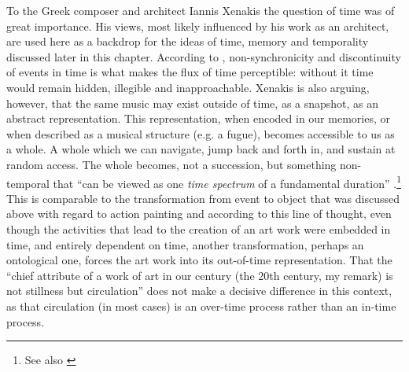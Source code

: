 
To the Greek composer and architect Iannis Xenakis the question of time was of great importance. His views, most likely influenced by his work as an architect, are used here as a backdrop for the ideas of time, memory and temporality discussed later in this chapter. According to \citet{xenakis71}, non-synchronicity and discontinuity of events in time is what makes the flux of time perceptible: without it time would remain hidden, illegible and inapproachable. %
Xenakis is also arguing, however, that the same music may exist outside of time, as a snapshot, as an abstract representation. This representation, when encoded in our memories, or when described as a musical structure (e.g. a fugue), becomes accessible to us as a whole. A whole which we can navigate, jump back and forth in, and sustain at random access. The whole becomes, not a succession, but something non-temporal that ``can be viewed as one \emph{time spectrum} of a fundamental duration'' \citep[73, my italics.]{roads}.\footnote{See also \citet{stockhausen57}}
This is comparable to the transformation from event to object that was discussed above with regard to action painting and according to this line of thought, even though the activities that lead to the creation of an art work were embedded in time, and entirely dependent on time, another transformation, perhaps an ontological one, forces the art work into its out-of-time representation. That the ``chief attribute of a work of art in our century (the 20th century, my remark) is not stillness but circulation'' \citep[93]{rosenberg66} does not make a decisive difference in this context, as that circulation (in most cases) is an over-time process rather than an in-time process.


